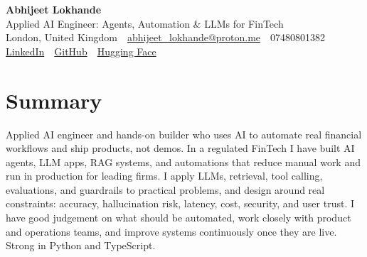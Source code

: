 \documentclass[10pt,a4paper]{article}
\newcommand{\sep}{\,\textcolor{accent!60}{\textbar}\,}
\begin{document}
\begin{center}
  {\fontsize{24}{26}\selectfont\bfseries Abhijeet Lokhande}\\[3pt]
  {\color{accent}\large Applied AI Engineer: Agents, Automation \& LLMs for FinTech}\\[5pt]
  {\small
    London, United Kingdom \sep
    \href{mailto:abhijeet_lokhande@proton.me}{abhijeet\_lokhande@proton.me} \sep
    07480801382 \\[2pt]
    \href{https://www.linkedin.com/in/ablds/}{LinkedIn} \sep
    \href{https://github.com/abhijeetscode}{GitHub} \sep
    \href{https://huggingface.co/ab-ai}{Hugging Face}
  }
\end{center}
\vspace{2pt}

\section{Summary}
Applied AI engineer and hands-on builder who uses AI to automate real financial workflows and ship products, not demos. In a regulated FinTech I have built AI agents, LLM apps, RAG systems, and automations that reduce manual work and run in production for leading firms. I apply LLMs, retrieval, tool calling, evaluations, and guardrails to practical problems, and design around real constraints: accuracy, hallucination risk, latency, cost, security, and user trust. I have good judgement on what should be automated, work closely with product and operations teams, and improve systems continuously once they are live. Strong in Python and TypeScript.

\end{document}
